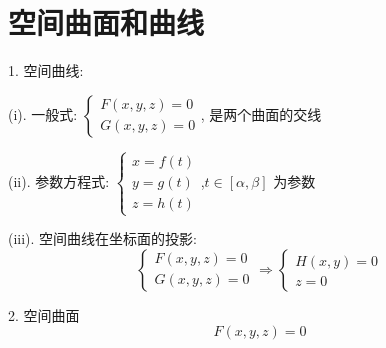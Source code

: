 \section{空间曲面和曲线}
\begin{definition}[空间曲面和曲线]
	1. 空间曲线: 
	
	(i). 一般式: $\left\lbrace\begin{array}{l}
		F(x,y,z)=0\\G(x,y,z)=0
	\end{array} \right. $, 是两个曲面的交线
	
	(ii). 参数方程式: $\left\lbrace\begin{array}{l}
		x=f(t)\\y=g(t)\\z=h(t)
	\end{array} \right. $,$t\in[\alpha,\beta]$ 为参数
	
	(iii). 空间曲线在坐标面的投影: 
	$$\left\lbrace\begin{array}{l}
		F(x,y,z)=0\\G(x,y,z)=0
	\end{array} \right. \Rightarrow \left\lbrace\begin{array}{l}
		H(x,y)=0\\z=0
	\end{array} \right.$$
	
	2. 空间曲面
	$$F(x,y,z)=0$$
\end{definition}
